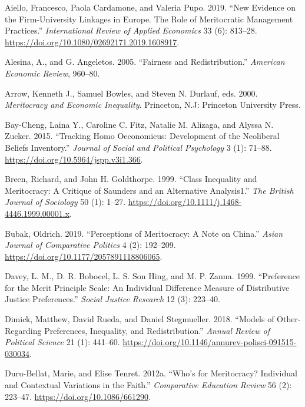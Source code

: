 \documentclass[
]{article}
\begin{document}
\hypertarget{refs}{}
\leavevmode\hypertarget{ref-AielloNewevidencefirmuniversity2019}{}%
Aiello, Francesco, Paola Cardamone, and Valeria Pupo. 2019. ``New
Evidence on the Firm-University Linkages in Europe. The Role of
Meritocratic Management Practices.'' \emph{International Review of
Applied Economics} 33 (6): 813--28.
\url{https://doi.org/10.1080/02692171.2019.1608917}.

\leavevmode\hypertarget{ref-alesina_Fairness_2005}{}%
Alesina, A., and G. Angeletos. 2005. ``Fairness and Redistribution.''
\emph{American Economic Review}, 960--80.

\leavevmode\hypertarget{ref-arrow_meritocracy_2000}{}%
Arrow, Kenneth J., Samuel Bowles, and Steven N. Durlauf, eds. 2000.
\emph{Meritocracy and Economic Inequality}. Princeton, N.J: Princeton
University Press.

\leavevmode\hypertarget{ref-Bay-ChengTrackingHomoOeconomicus2015}{}%
Bay-Cheng, Laina Y., Caroline C. Fitz, Natalie M. Alizaga, and Alyssa N.
Zucker. 2015. ``Tracking Homo Oeconomicus: Development of the Neoliberal
Beliefs Inventory.'' \emph{Journal of Social and Political Psychology} 3
(1): 71--88. \url{https://doi.org/10.5964/jspp.v3i1.366}.

\leavevmode\hypertarget{ref-breenClassInequalityMeritocracy1999}{}%
Breen, Richard, and John H. Goldthorpe. 1999. ``Class Inequality and
Meritocracy: A Critique of Saunders and an Alternative Analysis1.''
\emph{The British Journal of Sociology} 50 (1): 1--27.
\url{https://doi.org/10.1111/j.1468-4446.1999.00001.x}.

\leavevmode\hypertarget{ref-BubakPerceptionsmeritocracynote2019}{}%
Bubak, Oldrich. 2019. ``Perceptions of Meritocracy: A Note on China.''
\emph{Asian Journal of Comparative Politics} 4 (2): 192--209.
\url{https://doi.org/10.1177/2057891118806065}.

\leavevmode\hypertarget{ref-davey_preference_1999}{}%
Davey, L. M., D. R. Bobocel, L. S. Son Hing, and M. P. Zanna. 1999.
``Preference for the Merit Principle Scale: An Individual Difference
Measure of Distributive Justice Preferences.'' \emph{Social Justice
Research} 12 (3): 223--40.

\leavevmode\hypertarget{ref-dimick_Models_2018}{}%
Dimick, Matthew, David Rueda, and Daniel Stegmueller. 2018. ``Models of
Other-Regarding Preferences, Inequality, and Redistribution.''
\emph{Annual Review of Political Science} 21 (1): 441--60.
\url{https://doi.org/10.1146/annurev-polisci-091515-030034}.

\leavevmode\hypertarget{ref-Duru-BellatWhoMeritocracyIndividual2012b}{}%
Duru-Bellat, Marie, and Elise Tenret. 2012a. ``Who's for Meritocracy?
Individual and Contextual Variations in the Faith.'' \emph{Comparative
Education Review} 56 (2): 223--47. \url{https://doi.org/10.1086/661290}.
\end{document}
